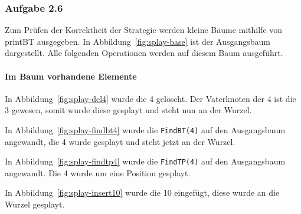 \subsubsection{Aufgabe 2.6} Zum Prüfen der Korrektheit der Strategie werden kleine Bäume mithilfe von
printBT ausgegeben.
In Abbildung~\ref{fig:splay-base} ist der Ausgangsbaum dargestellt.
Alle folgenden Operationen werden auf diesem Baum ausgeführt.

\paragraph{Im Baum vorhandene Elemente}
In Abbildung~\ref{fig:splay-del4} wurde die 4 gelöscht.
Der Vaterknoten der 4 ist die 3 gewesen, somit wurde diese gesplayt und steht nun an der Wurzel.

In Abbildung~\ref{fig:splay-findbt4} wurde die \verb|FindBT(4)| auf den Ausgangsbaum angewandt,
die 4 wurde gesplayt und steht jetzt an der Wurzel.

In Abbildung~\ref{fig:splay-findtp4} wurde die \verb|FindTP(4)| auf den Ausgangsbaum angewandt.
Die 4 wurde um eine Position gesplayt.

In Abbildung~\ref{fig:splay-insert10} wurde die 10 eingefügt, diese wurde an die Wurzel gesplayt.

